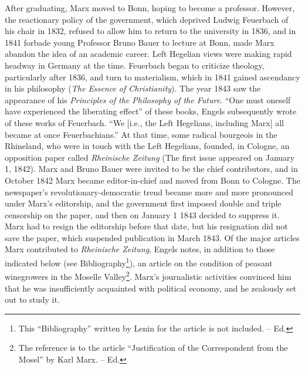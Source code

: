 \documentclass[a4paper,12pt]{book}
\newcommand{\q}[1]{``#1''}
\begin{document}
After graduating, Marx moved to Bonn, hoping to become a professor. However, the reactionary policy of the government, which deprived Ludwig Feuerbach of his chair in 1832, refused to allow him to return to the university in 1836, and in 1841 forbade young Professor Bruno Bauer to lecture at Bonn, made Marx abandon the idea of an academic career. Left Hegelian views were making rapid headway in Germany at the time. Feuerbach began to criticize theology, particularly after 1836, and turn to materialism, which in 1841 gained ascendancy in his philosophy (\emph{The Essence of Christianity}). The year 1843 saw the appearance of his \emph{Principles of the Philosophy of the Future}. \q{One must oneself have experienced the liberating effect} of these books, Engels subsequently wrote of these works of Feuerbach. \q{We [i.e., the Left Hegelians, including Marx] all became at once Feuerbachians.} At that time, some radical bourgeois in the Rhineland, who were in touch with the Left Hegelians, founded, in Cologne, an opposition paper called \emph{Rheinische Zeitung} (The first issue appeared on January 1, 1842). Marx and Bruno Bauer were invited to be the chief contributors, and in October 1842 Marx became editor-in-chief and moved from Bonn to Cologne. The newspaper’s revolutionary-democratic trend became more and more pronounced under Marx’s editorship, and the government first imposed double and triple censorship on the paper, and then on January 1 1843 decided to suppress it. Marx had to resign the editorship before that date, but his resignation did not save the paper, which suspended publication in March 1843. Of the major articles Marx contributed to \emph{Rheinische Zeitung}, Engels notes, in addition to those indicated below (see Bibliography\footnote{This “Bibliography” written by Lenin for the article is not included. -- Ed.}), an article on the condition of peasant winegrowers in the Moselle Valley\footnote{The reference is to the article “Justification of the Correspondent from the Mosel” by Karl Marx. -- Ed.}. Marx’s journalistic activities convinced him that he was insufficiently acquainted with political economy, and he zealously set out to study it.
\end{document}
